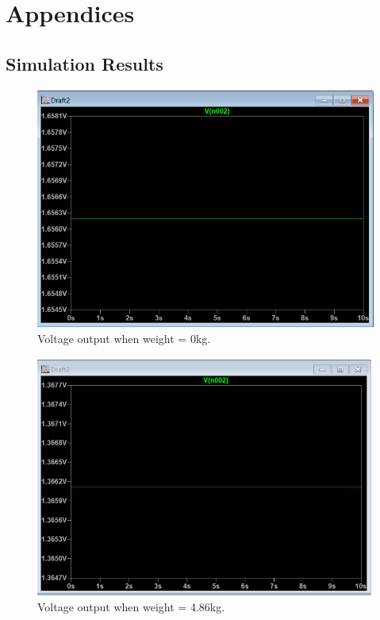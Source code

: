 
\part{Appendices}


\chapter{Simulation Results}

\begin{figure}[h]
\centering
\includegraphics[width=\textwidth]{final-report/assets/0kg_sim.png}
\caption{Voltage output when weight = 0kg.}
\end{figure}

\begin{figure}[h]
\centering
\includegraphics[width=\textwidth]{final-report/assets/5kg_sim.png}
\caption{Voltage output when weight = 4.86kg.}
\end{figure}

